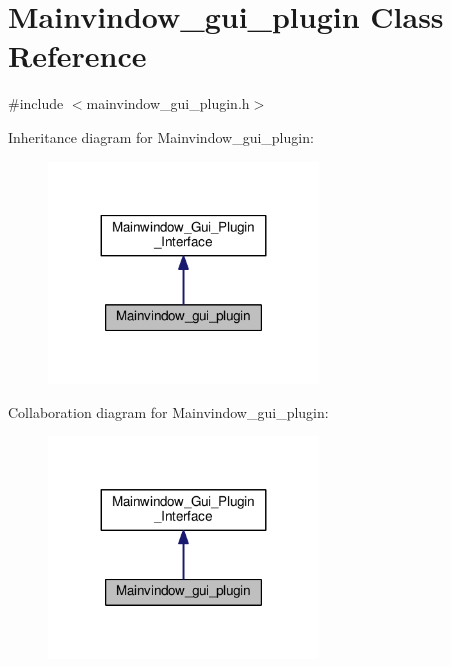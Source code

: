 \hypertarget{classMainvindow__gui__plugin}{}\section{Mainvindow\+\_\+gui\+\_\+plugin Class Reference}
\label{classMainvindow__gui__plugin}


{\ttfamily \#include $<$mainvindow\+\_\+gui\+\_\+plugin.\+h$>$}



Inheritance diagram for Mainvindow\+\_\+gui\+\_\+plugin\+:\nopagebreak
\begin{figure}[H]
\begin{center}
\leavevmode
\includegraphics[width=203pt]{classMainvindow__gui__plugin__inherit__graph}
\end{center}
\end{figure}


Collaboration diagram for Mainvindow\+\_\+gui\+\_\+plugin\+:\nopagebreak
\begin{figure}[H]
\begin{center}
\leavevmode
\includegraphics[width=203pt]{classMainvindow__gui__plugin__coll__graph}
\end{center}
\end{figure}
